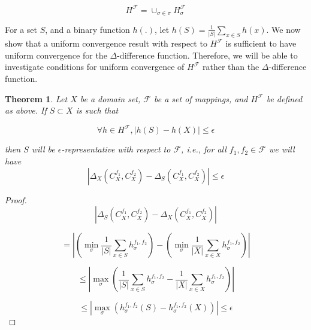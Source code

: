 \documentclass[letterpaper,12pt,titlepage,oneside,final]{book}
\newtheorem{theorem}{Theorem}
\begin{document}
\begin{equation}
H^{\mathcal{F}} = \cup_{\sigma \in \pi} H^{\mathcal{F}}_\sigma
\end{equation}

For a set $S$, and a binary function $h(.)$, let $h(S) = \frac{1}{|S|}\sum_{x\in S} h(x)$. We now show that a uniform convergence result with respect to $H^{\mathcal{F}}$ is sufficient to have uniform convergence for the $\Delta$-difference function. Therefore, we will be able to investigate conditions for uniform convergence of $H^{\mathcal{F}}$ rather than the $\Delta$-difference function.

 
\begin{theorem}
Let $X$ be a domain set, $\mathcal{F}$ be a set of mappings, and $H^{\mathcal{F}}$ be defined as above. If $S\subset X$ is such that 

\begin{equation}
\forall h \in H^{\mathcal{F}}, |h(S) - h(X)| \leq \epsilon
\end{equation}

then $S$ will be $\epsilon$-representative with respect to $\mathcal{F}$, i.e., for all $f_1,f_2 \in \mathcal{F}$ we will have
\begin{equation}
|\Delta_{X}(C^{f_1}_X, C^{f_2}_X) - \Delta_{S}(C^{f_1}_X, C^{f_2}_X)| \leq \epsilon
\end{equation}


\end{theorem}


\begin{proof}

\begin{equation}
|\Delta_S(C^{f_1}_X,C^{f_2}_X) - \Delta_X(C^{f_1}_X,C^{f_2}_X)|
\end{equation}

\begin{equation}
=\left|\left(\min_\sigma \frac{1}{|S|} \sum_{x\in S} h^{f_1,f_2}_{\sigma}\right) - \left(\min_\sigma \frac{1}{|X|} \sum_{x\in X} h^{f_1,f_2}_{\sigma}\right)\right|
\end{equation}

\begin{equation}
\leq \left| \max_\sigma \left(\frac{1}{|S|} \sum_{x\in S} h^{f_1,f_2}_{\sigma} - \frac{1}{|X|} \sum_{x\in X} h^{f_1,f_2}_{\sigma}\right)\right|
\end{equation}

\begin{equation}
\leq \left| \max_\sigma \left( h^{f_1,f_2}_{\sigma}(S) -  h^{f_1,f_2}_{\sigma}(X)  \right)\right| \leq \epsilon
\end{equation}


\end{proof}
\end{document}
